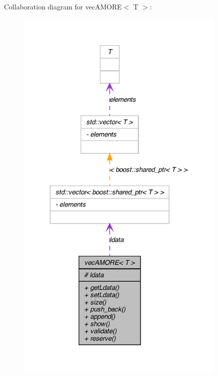 Collaboration diagram for vecAMORE$<$ T $>$:\nopagebreak
\begin{figure}[H]
\begin{center}
\leavevmode
\includegraphics[width=288pt]{classvec_a_m_o_r_e__coll__graph}
\end{center}
\end{figure}
